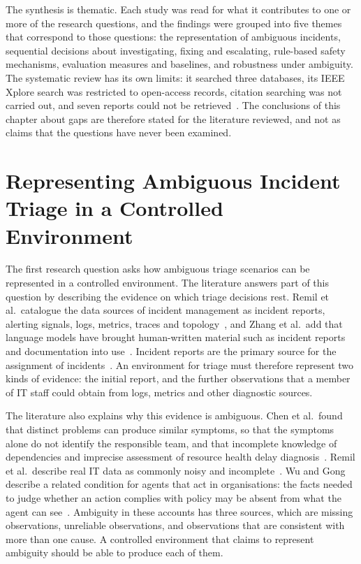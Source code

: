 The synthesis is thematic. Each study was read for what it contributes to one or more of the research questions, and the findings were grouped into five themes that correspond to those questions: the representation of ambiguous incidents, sequential decisions about investigating, fixing and escalating, rule-based safety mechanisms, evaluation measures and baselines, and robustness under ambiguity. The systematic review has its own limits: it searched three databases, its IEEE Xplore search was restricted to open-access records, citation searching was not carried out, and seven reports could not be retrieved~\cite{opol2026slr}. The conclusions of this chapter about gaps are therefore stated for the literature reviewed, and not as claims that the questions have never been examined.

\section{Representing Ambiguous Incident Triage in a Controlled Environment}

The first research question asks how ambiguous triage scenarios can be represented in a controlled environment. The literature answers part of this question by describing the evidence on which triage decisions rest. Remil et al.\ catalogue the data sources of incident management as incident reports, alerting signals, logs, metrics, traces and topology~\cite{remil2024}, and Zhang et al.\ add that language models have brought human-written material such as incident reports and documentation into use~\cite{zhang2025}. Incident reports are the primary source for the assignment of incidents~\cite{remil2024}. An environment for triage must therefore represent two kinds of evidence: the initial report, and the further observations that a member of IT staff could obtain from logs, metrics and other diagnostic sources.

The literature also explains why this evidence is ambiguous. Chen et al.\ found that distinct problems can produce similar symptoms, so that the symptoms alone do not identify the responsible team, and that incomplete knowledge of dependencies and imprecise assessment of resource health delay diagnosis~\cite{chen2020}. Remil et al.\ describe real IT data as commonly noisy and incomplete~\cite{remil2024}. Wu and Gong describe a related condition for agents that act in organisations: the facts needed to judge whether an action complies with policy may be absent from what the agent can see~\cite{wugong2026}. Ambiguity in these accounts has three sources, which are missing observations, unreliable observations, and observations that are consistent with more than one cause. A controlled environment that claims to represent ambiguity should be able to produce each of them.

